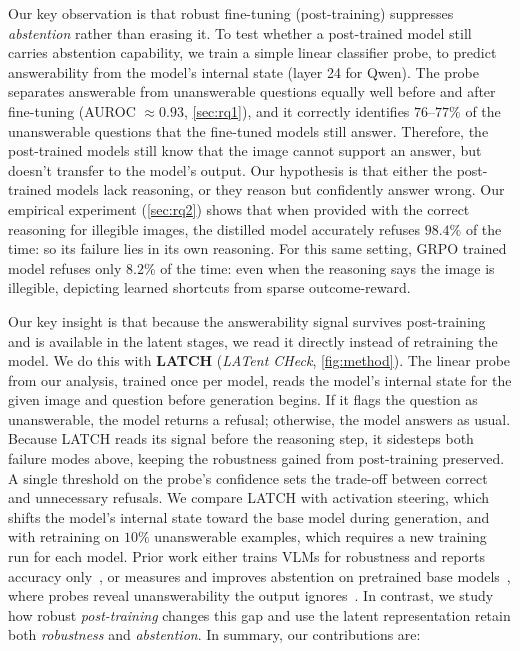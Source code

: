 Our key observation is that robust fine-tuning (post-training) suppresses \emph{abstention} rather than erasing it. To test whether a post-trained model still carries abstention capability, we train a
simple linear classifier probe, to predict answerability from the model's internal state (layer 24 for Qwen). The probe separates answerable from unanswerable questions equally well before and after fine-tuning (AUROC $\approx 0.93$, \cref{sec:rq1}), and it correctly identifies $76$--$77\%$ of the unanswerable questions that the fine-tuned models still answer. Therefore, the post-trained models still know that the image cannot support an answer, but doesn't transfer to the model's output. Our hypothesis is that either the post-trained models lack reasoning, or they reason but confidently answer wrong. Our empirical experiment (\cref{sec:rq2}) shows that when provided with the correct reasoning for illegible images, the distilled model accurately refuses $98.4\%$ of the time: so its failure lies in its own reasoning. For this same setting, GRPO trained model refuses only $8.2\%$ of the time: even when the reasoning says the image is illegible, depicting learned shortcuts from sparse outcome-reward.


Our key insight is that because the answerability signal survives post-training and is available in the latent stages, we read it directly instead of
retraining the model. We do this with \textbf{LATCH} (\emph{LATent CHeck}, \cref{fig:method}). The linear probe from our analysis, trained once per model, reads the model's internal state for the given image and question before generation begins. If it flags the question as
unanswerable, the model returns a refusal; otherwise, the model answers as usual. Because LATCH reads its signal before the reasoning step, it sidesteps both failure modes above, keeping the robustness gained
from post-training preserved. A single threshold on the probe's confidence sets the trade-off between correct and unnecessary refusals. We compare LATCH with activation steering, which shifts the model's internal state toward the base model during generation, and with retraining on $10\%$ unanswerable examples, which requires a new training run for each model. Prior work either trains VLMs for robustness and reports accuracy only~\cite{usama2025analysing,he2026videoreasoningmodelsready,tang2026robustr1,
liu2026roma}, or measures and improves abstention on pretrained base models~\cite{miyai2024upd,zhu2025mohobench,saadat2025visiontrap,madhusudhan2026knowing,
vardi2025clipup}, where probes reveal unanswerability the output ignores~\cite{he2026knowing,pramono2026trapsbench,kadavath2022know,burns2023discovering}.
In contrast, we study how robust \emph{post-training} changes this gap and use the latent representation retain both \emph{robustness} and \emph{abstention}. In summary, our contributions are:

